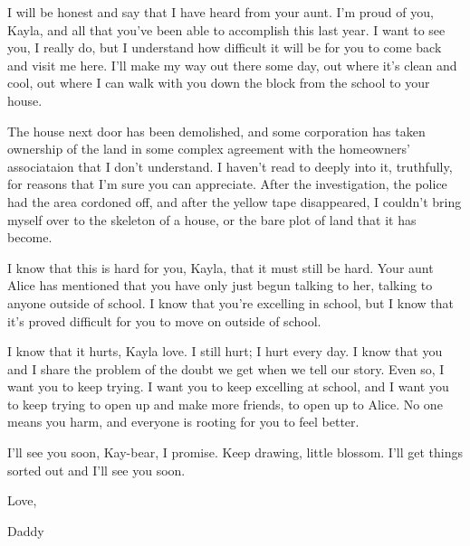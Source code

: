 \begin{itshape}
I will be honest and say that I have heard from your aunt.  I'm proud of you, Kayla, and all that you've been able to accomplish this last year.  I want to see you, I really do, but I understand how difficult it will be for you to come back and visit me here.  I'll make my way out there some day, out where it's clean and cool, out where I can walk with you down the block from the school to your house.

The house next door has been demolished, and some corporation has taken ownership of the land in some complex agreement with the homeowners' associataion that I don't understand.  I haven't read to deeply into it, truthfully, for reasons that I'm sure you can appreciate.  After the investigation, the police had the area cordoned off, and after the yellow tape disappeared, I couldn't bring myself over to the skeleton of a house, or the bare plot of land that it has become.

I know that this is hard for you, Kayla, that it must still be hard.  Your aunt Alice has mentioned that you have only just begun talking to her, talking to anyone outside of school.  I know that you're excelling in school, but I know that it's proved difficult for you to move on outside of school.

I know that it hurts, Kayla love.  I still hurt; I hurt every day.  I know that you and I share the problem of the doubt we get when we tell our story.  Even so, I want you to keep trying.  I want you to keep excelling at school, and I want you to keep trying to open up and make more friends, to open up to Alice.  No one means you harm, and everyone is rooting for you to feel better.

I'll see you soon, Kay-bear, I promise.  Keep drawing, little blossom.  I'll get things sorted out and I'll see you soon.

Love,

Daddy
\end{itshape}
